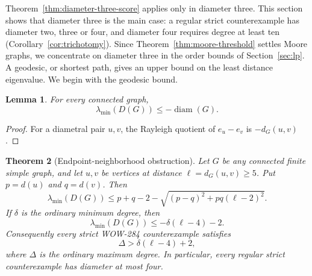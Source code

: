 \documentclass[a4paper,10pt,reqno]{amsart}
\theoremstyle{plain}
\newtheorem{theorem}{Theorem}[section]
\newtheorem{lemma}[theorem]{Lemma}
\theoremstyle{definition}
\theoremstyle{remark}
\newcommand{\diam}{\operatorname{diam}}
\newcommand{\resultbox}[1]{\boxed{#1}}
\begin{document}
Theorem~\ref{thm:diameter-three-score} applies only in diameter three. This
section shows that diameter three is the main case: a regular strict
counterexample has diameter two, three or four, and diameter four requires
degree at least ten (Corollary~\ref{cor:trichotomy}). Since
Theorem~\ref{thm:moore-threshold} settles Moore graphs, we concentrate on
diameter three in the order bounds of Section~\ref{sec:lp}.
A geodesic, or shortest path, gives an upper bound on the least distance
eigenvalue. We begin with the geodesic bound.

\begin{lemma}\label{lem:diam-rayleigh}
For every connected graph,
\[
 \lambda_{\min}(D(G))\le-\diam(G).
\]
\end{lemma}

\begin{proof}
For a diametral pair \(u,v\), the Rayleigh quotient of \(e_u-e_v\) is
\(-d_G(u,v)\).
\end{proof}

\begin{theorem}[Endpoint-neighborhood obstruction]\label{thm:endpoint-diameter}
Let \(G\) be any connected finite simple graph, and let \(u,v\) be vertices at
distance \(\ell=d_G(u,v)\ge5\).  Put \(p=d(u)\) and \(q=d(v)\).  Then
\[
 \resultbox{
 \lambda_{\min}(D(G))
 \le p+q-2-\sqrt{(p-q)^2+pq(\ell-2)^2}.
 }
\]
If \(\delta\) is the ordinary minimum degree, then
\[
 \resultbox{
 \lambda_{\min}(D(G))\le-\delta(\ell-4)-2.
 }
\]
Consequently every strict WOW-284 counterexample satisfies
\[
 \Delta>\delta(\ell-4)+2,
\]
where \(\Delta\) is the ordinary maximum degree.
In particular, every regular strict counterexample has diameter at most four.
\end{theorem}
\end{document}
